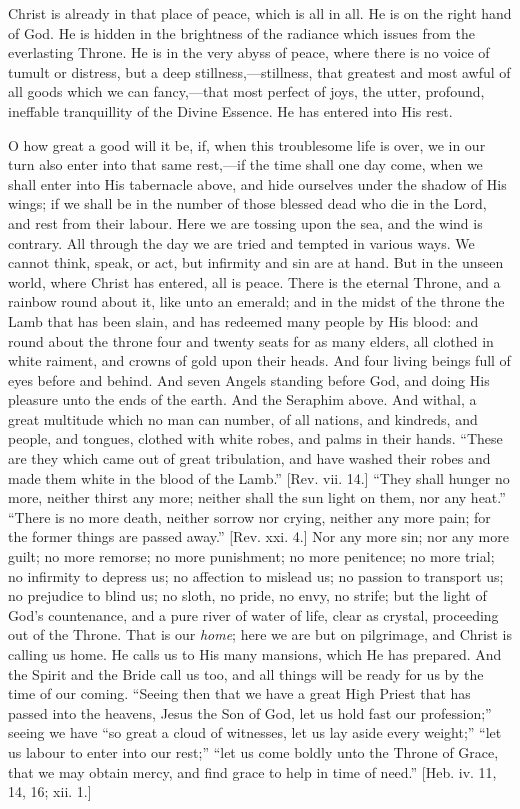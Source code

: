 Christ is already in that place of peace, which is all in all. He
is on the right hand of God. He is hidden in the brightness of the
radiance which issues from the everlasting Throne. He is in the very
abyss of peace, where there is no voice of tumult or distress, but a
deep stillness,—stillness, that greatest and most awful of all goods
which we can fancy,—that most perfect of joys, the utter, profound,
ineffable tranquillity of the Divine Essence. He has entered into His
rest.

O how great a good will it be, if, when this troublesome life is
over, we in our turn also enter into that same rest,—if the time
shall one day come, when we shall enter into His tabernacle above, and
hide ourselves under the shadow of His wings; if we shall be in the
number of those blessed dead who die in the Lord, and rest from their
labour. Here we are tossing upon the sea, and the wind is contrary.
All through the day we are tried and tempted in various ways. We
cannot think, speak, or act, but infirmity and sin are at hand. But in
the unseen world, where Christ has entered, all is peace. There is the
eternal Throne, and a rainbow round about it, like unto an emerald;
and in the midst of the throne the Lamb that has been slain, and has
redeemed many people by His blood: and round about the throne four and
twenty seats for as many elders, all clothed in white raiment, and
crowns of gold upon their heads. And four living beings full of eyes
before and behind. And seven Angels standing before God, and doing His
pleasure unto the ends of the earth. And the Seraphim above. And
withal, a great multitude which no man can number, of all nations, and
kindreds, and people, and tongues, clothed with white robes, and palms
in their hands. ``These are they which came out of great
tribulation, and have washed their robes and made them white in the
blood of the Lamb.'' [Rev. vii. 14.] ``They shall hunger no
more, neither thirst any more; neither shall the sun light on them,
nor any heat.'' ``There is no more death, neither sorrow nor
crying, neither any more pain; for the former things are passed
away.'' [Rev. xxi. 4.] Nor any more sin; nor any more guilt; no
more remorse; no more punishment; no more penitence; no more trial; no
infirmity to depress us; no affection to mislead us; no passion to
transport us; no prejudice to blind us; no sloth, no pride, no envy,
no strife; but the light of God's countenance, and a pure river of
water of life, clear as crystal, proceeding out of the Throne. That is
our \emph{home}; here we are but on pilgrimage, and Christ is calling
us home. He calls us to His many mansions, which He has prepared. And
the Spirit and the Bride call us too, and all things will be ready for
us by the time of our coming. ``Seeing then that we have a great
High Priest that has passed into the heavens, Jesus the Son of God,
let us hold fast our profession;'' seeing we have ``so great a
cloud of witnesses, let us lay aside every weight;'' ``let us
labour to enter into our rest;'' ``let us come boldly unto the
Throne of Grace, that we may obtain mercy, and find grace to help in
time of need.'' [Heb. iv. 11, 14, 16; xii. 1.]


